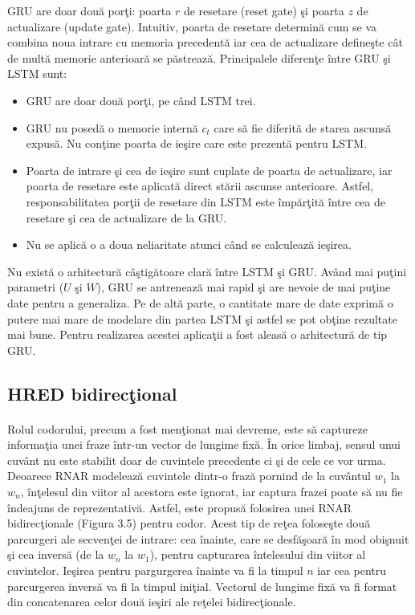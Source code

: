 GRU are doar dou\u a por\c ti: poarta \(r\) de resetare (reset gate) \c si poarta \(z\) de actualizare (update gate). Intuitiv, poarta de resetare determin\u a cum se va combina noua intrare cu memoria precedent\u a iar cea de actualizare define\c ste c\^ at de mult\u a memorie anterioar\u a se p\u astreaz\u a. Principalele diferen\c te \^ intre GRU \c si LSTM sunt:
\begin{itemize}
  \item GRU are doar dou\u a por\c ti, pe c\^ and LSTM trei.
  \item GRU nu posed\u a o memorie intern\u a \(c_{t}\) care s\u a fie diferit\u a de starea ascuns\u a expus\u a. Nu con\c tine poarta de ie\c sire care este prezent\u a pentru LSTM.
  \item Poarta de intrare \c si cea de ie\c sire sunt cuplate de poarta de actualizare, iar poarta de resetare este aplicat\u a direct st\u arii ascunse anterioare. Astfel, responsabilitatea por\c tii de resetare din LSTM este \^ imp\u ar\c tit\u a \^ intre cea de resetare \c si cea de actualizare de la GRU.
  \item Nu se aplic\u a o a doua neliaritate atunci c\^ and se calculeaz\u a ie\c sirea.
\end{itemize}

Nu exist\u a o arhitectur\u a c\^ a\c stig\u atoare clar\u a \^ intre LSTM \c si GRU. Av\^ and mai pu\c tini parametri (\(U\) \c si \(W\)), GRU se antreneaz\u a mai rapid \c si are nevoie de mai pu\c tine date pentru a generaliza. Pe de alt\u a parte, o cantitate mare de date	exprim\u a o putere mai mare de modelare din partea LSTM \c si astfel se pot ob\c tine rezultate mai bune. Pentru realizarea acestei aplica\c tii a fost aleas\u a o arhitectur\u a de tip GRU.

\subsection{HRED bidirec\c tional}

\paragraph{}
Rolul codorului, precum a fost men\c tionat mai devreme, este s\u a captureze informa\c tia unei fraze \^ intr-un vector de lungime fix\u a. \^ In orice limbaj, sensul unui cuv\^ ant nu este stabilit doar de cuvintele precedente ci \c si de cele ce vor urma. Deoarece RNAR modeleaz\u a cuvintele dintr-o fraz\u a pornind de la cuv\^ antul \(w_{1}\) la \(w_{n}\), \^ in\c telesul din viitor al acestora este ignorat, iar captura frazei poate s\u a nu fie \^ indeajuns de reprezentativ\u a. Astfel, este propus\u a folosirea unei RNAR bidirec\c tionale (Figura 3.5) pentru codor. Acest tip de re\c tea folose\c ste dou\u a parcurgeri ale secven\c tei de intrare: cea \^ inainte, care se desf\u a\c soar\u a \^ in mod obi\c snuit \c si cea invers\u a (de la \(w_{n}\) la \(w_{1}\)), pentru capturarea \^ intelesului din viitor al cuvintelor. Ie\c sirea pentru pargurgerea \^ inainte va fi la timpul \(n\) iar cea pentru parcurgerea invers\u a va fi la timpul ini\c tial. Vectorul de lungime fix\u a va fi format din concatenarea celor dou\u a ie\c siri ale re\c telei bidirec\c tionale.

